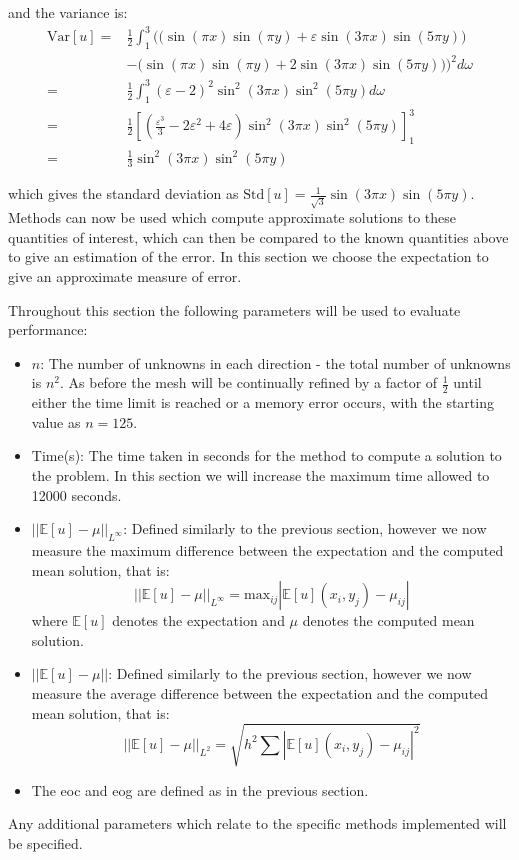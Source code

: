 \documentclass[11pt]{article}
\numberwithin{equation}{section}
\begin{document}
and the variance is:
\begin{equation}
\begin{split}
\text{Var}[u] = & \frac{1}{2} \int_{1}^3 \Big( \big( \sin(\pi x) \sin(\pi y) + \varepsilon \sin(3 \pi x) \sin(5 \pi y) \big) \\
& - \big(\sin(\pi x) \sin(\pi y) + 2\sin(3\pi x)\sin(5\pi y) \big) \Big)^2 d \omega \\
= & \frac{1}{2} \int_{1}^3 (\varepsilon-2)^2 \sin^2 (3 \pi x) \sin^2 (5 \pi y) d \omega \\
= & \frac{1}{2} \left[ \left( \frac{\varepsilon^3}{3}-2\varepsilon^2 + 4\varepsilon \right) \sin^2 (3 \pi x) \sin^2 (5 \pi y) \right]_{1}^3 \\
= & \frac{1}{3} \sin^2 (3 \pi x) \sin^2 (5 \pi y)
\end{split}
\end{equation}

which gives the standard deviation as $\text{Std}[u] = \frac{1}{\sqrt{3}} \sin(3 \pi x) \sin(5 \pi y)$. Methods can now be used which compute approximate solutions to these quantities of interest, which can then be compared to the known quantities above to give an estimation of the error. In this section we choose the expectation to give an approximate measure of error.

Throughout this section the following parameters will be used to evaluate performance:
\begin{itemize}
\item $n$: The number of unknowns in each direction - the total number of unknowns is $n^2$. As before the mesh will be continually refined by a factor of $\frac{1}{2}$ until either the time limit is reached or a memory error occurs, with the starting value as $n=125$.
\item Time(s): The time taken in seconds for the method to compute a solution to the problem. In this section we will increase the maximum time allowed to 12000 seconds. 
\item $|| \mathbb{E}[u] - \mu ||_{L^\infty} $: Defined similarly to the previous section, however we now measure the maximum difference between the expectation and the computed mean solution, that is:
 \[ || \mathbb{E}[u] - \mu ||_{L^\infty} = \text{max}_{ij} | \mathbb{E}[u](x_i,y_j) - \mu_{ij} | \]
where $\mathbb{E}[u]$ denotes the expectation and $\mu$ denotes the computed mean solution.
\item $\left|\left| \mathbb{E}[u] - \mu \right|\right|$: Defined similarly to the previous section, however we now measure the average difference between the expectation and the computed mean solution, that is:
\[ \left| \left| \mathbb{E}[u] - \mu \right| \right|_{L^2} = \sqrt{h^2 \sum \left| \mathbb{E}[u](x_i,y_j) - \mu_{ij} \right|^2} \]
\item The eoc and eog are defined as in the previous section.
\end{itemize}
Any additional parameters which relate to the specific methods implemented will be specified. 
\end{document}
